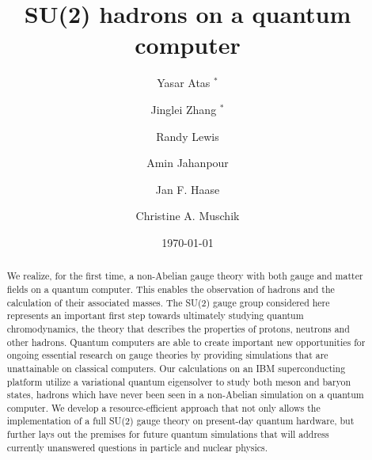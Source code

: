 \documentclass[twocolumn,aps,showpacs,prb,superscriptaddress,floatfix,10pt,nofootinbib]{revtex4-2}
\begin{document}
\title{SU(2) hadrons on a quantum computer}
\author{Yasar Atas $^*$}
\author{Jinglei Zhang $^*$}
\author{Randy Lewis}
\author{Amin Jahanpour}
\author{Jan F. Haase}
\author{Christine A. Muschik}


\date{\today}



\begin{abstract}
	
We realize, for the first time, a non-Abelian gauge theory with both gauge and matter fields on a quantum computer. This enables the observation of hadrons and the calculation of their associated masses.
The SU(2) gauge group considered here represents an important first step towards ultimately studying quantum chromodynamics, the theory that describes the properties of protons, neutrons and other hadrons.
Quantum computers are able to create important new opportunities for ongoing essential research on gauge theories by providing simulations that are unattainable on classical computers. Our calculations on an IBM superconducting platform utilize a variational quantum eigensolver to study both meson and baryon states, hadrons which have never been seen in a non-Abelian simulation on a quantum computer.
We develop a resource-efficient approach that not only allows the implementation of a full SU(2) gauge theory on present-day quantum hardware, but further lays out the premises for future quantum simulations that will address currently unanswered questions in particle and nuclear physics.
\end{abstract}
\end{document}
